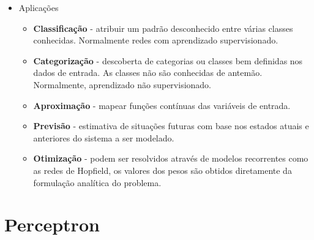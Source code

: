 \documentclass{article}
\begin{document}
\begin{itemize}
	\item Aplicações

	\begin{itemize}
		\item \textbf{Classificação} - atribuir um padrão desconhecido entre várias classes conhecidas. Normalmente redes com aprendizado supervisionado.
		\item \textbf{Categorização} - descoberta de categorias ou classes bem definidas nos dados de entrada. As classes não são conhecidas de antemão. Normalmente, aprendizado não supervisionado.
		\item \textbf{Aproximação} - mapear funções contínuas das variáveis de entrada.
		\item \textbf{Previsão} - estimativa de situações futuras com base nos estados atuais e anteriores do sistema a ser modelado.
		\item \textbf{Otimização} - podem ser resolvidos através de modelos recorrentes como as redes de Hopfield, os valores dos pesos são obtidos diretamente da formulação analítica do problema.
	\end{itemize}

\end{itemize}

\section{Perceptron}
\end{document}
